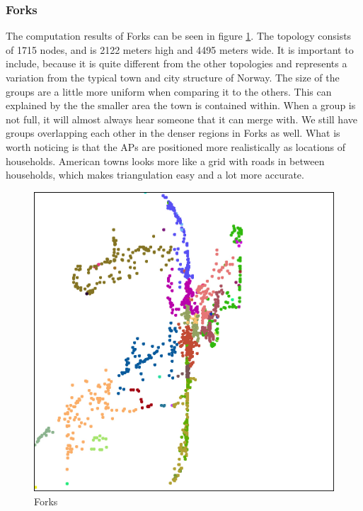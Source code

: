 	\subsubsection{Forks}

	The computation results of Forks can be seen in figure \ref{fig:forks_topo}. 
	The topology consists of 1715 nodes, and is 2122 meters high and 4495 meters wide. It
	is important to include, because it is quite different from the other topologies and
	represents a variation from the typical town and city structure of Norway.
	The size of the groups are a little more uniform when comparing it to the others.
	This can explained by the the smaller area the town is contained within. When a group
	is not full, it will almost always hear someone that it can merge with.
	We still have groups overlapping each other in the denser regions in Forks as well. 
	What is worth noticing is that the APs are positioned more realistically as locations
	of households. American towns looks more like a grid with roads in between households,
	which makes triangulation easy and a lot more accurate. 

	\begin{figure}
	\center
	\includegraphics[scale=0.46]{Images/cities/forks_groups.jpg}
	\caption{Forks}
	\label{fig:forks_topo}
	\end{figure}





